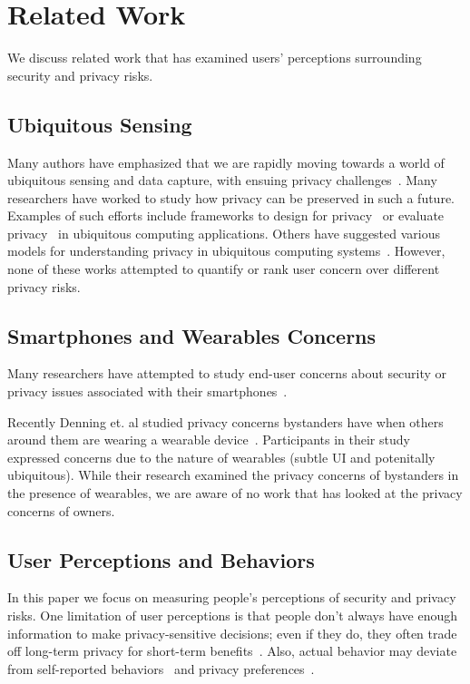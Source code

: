 \section{Related Work}
We discuss related work that has examined users' perceptions surrounding security and privacy risks.

\subsection{Ubiquitous Sensing}
Many authors have emphasized that we are rapidly moving towards a world of ubiquitous sensing and data capture, with ensuing privacy challenges~\cite{abowd2000charting,palen2003unpacking,camp2000internet}. Many researchers have worked to study how privacy can be preserved in such a future. Examples of such efforts include frameworks to design for privacy~\cite{bellotti1993design,camp2003designing,langheinrich2001privacy} or evaluate privacy~\cite{scholtz2004toward} in ubiquitous computing applications. Others have suggested various models for understanding privacy in ubiquitous computing systems~\cite{hong2004privacy, jiang2002approximate}.
However, none of these works attempted to quantify or rank user concern over different privacy risks.

\subsection{Smartphones and Wearables Concerns}
Many researchers have attempted to study end-user concerns about security or privacy issues associated with their smartphones~\cite{chin2012measuring, palen2000going, felt2012android}. 

Recently Denning et. al studied privacy concerns bystanders have when others around them are wearing a wearable device~\cite{Denning2014}. Participants in their study expressed concerns due to the nature of wearables (subtle UI and potenitally ubiquitous). While their research examined the privacy concerns of bystanders in the presence of wearables, we are aware of no work that has looked at the privacy concerns of owners.

\subsection{User Perceptions and Behaviors}
In this paper we focus on measuring people's perceptions of security and privacy risks.
One limitation of user perceptions is that people don't always have enough information to make privacy-sensitive decisions; even if they do, they often trade off long-term privacy for short-term benefits~\cite{acquisti2005privacy}. Also, actual behavior may deviate from self-reported behaviors~\cite{jensen2005privacy} and privacy preferences~\cite{spiekermann2001privacy}. 